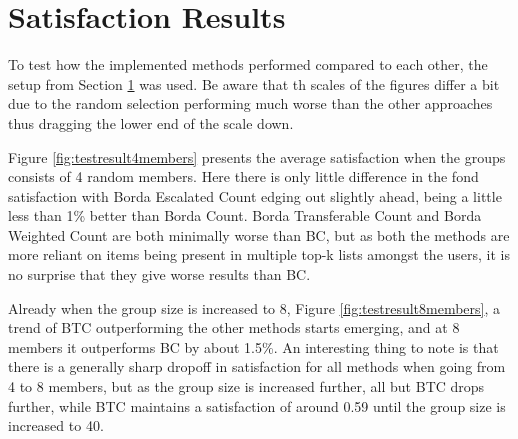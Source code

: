 \section{Satisfaction Results} 

To test how the implemented methods performed compared to each other, the setup from Section \ref{}  was used. Be aware that th scales of the figures differ a bit due to the random selection performing much worse than the other approaches thus dragging the lower end of the scale down.

Figure \ref{fig:testresult4members} presents the average satisfaction when the groups consists of 4 random members. Here there is only little difference in the fond satisfaction with Borda Escalated Count edging out slightly ahead, being a little less than 1\% better than Borda Count. Borda Transferable Count and Borda Weighted Count are both minimally worse than BC, but as both the methods are more reliant on items being present in multiple top-k lists amongst the users, it is no surprise that they give worse results than BC.

Already when the group size is increased to 8, Figure \ref{fig:testresult8members}, a trend of BTC outperforming the other methods starts emerging, and at 8 members it outperforms BC by about 1.5\%. An interesting thing to note is that there is a generally sharp dropoff in satisfaction for all methods when going from 4 to 8 members, but as the group size is increased further, all but BTC drops further, while BTC maintains a satisfaction of around 0.59 until the group size is increased to 40.

